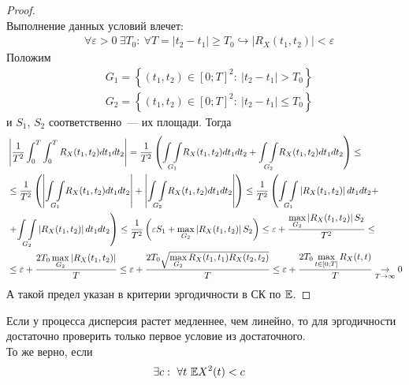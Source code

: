 \begin{proof}
    ~
    \\
    Выполнение данных условий влечет:
    \begin{align*}
      & \forall \varepsilon > 0 \ \exists T_0: \ \forall T = \left| t_2-t_1 \right|\geq T_0 \hookrightarrow \left| R_X(t_1,t_2) \right| < \varepsilon
    \end{align*}
    Положим
    \begin{align*}
      & G_1 = \left\{ (t_1,t_2) \in [0;T]^2: \ \left| t_2-t_1 \right| > T_0 \right\}
    \end{align*}
    \begin{align*}
      & G_2 = \left\{ (t_1,t_2) \in [0;T]^2: \ \left| t_2-t_1 \right| \leq T_0 \right\}
    \end{align*}
    и $S_1$, $S_2$ соответственно~--- их площади. Тогда
    \begin{align*}
      & \left| \frac{1}{T^2} \int_0^T\int_0^TR_X(t_1,t_2)dt_1dt_2 \right| = \frac{1}{T^2} \left( \underset{G_1}{\int\int}R_X(t_1,t_2)dt_1dt_2 + \underset{G_2}{\int\int}R_X(t_1,t_2)dt_1dt_2 \right) \leq \\
      & \leq \frac{1}{T^2} \left( \left| \underset{G_1}{\int\int}R_X(t_1,t_2)dt_1dt_2 \right| + \left| \underset{G_2}{\int\int}R_X(t_1,t_2)dt_1dt_2 \right| \right) \leq \frac{1}{T^2} \left( \underset{G_1}{\int\int}\left| R_X(t_1,t_2) \right| dt_1dt_2 + \right. \\
      & \left. + \underset{G_2}{\int\int}\left| R_X(t_1,t_2) \right| dt_1dt_2 \right) \leq \frac{1}{T^2} \left( \varepsilon S_1 + \max_{G_2}\left| R_X(t_1,t_2) \right| S_2 \right) \leq \varepsilon + \frac{\displaystyle \max_{G_2}\left| R_X(t_1,t_2) \right| S_2}{T^2} \leq \\
      & \leq \varepsilon + \frac{2T_0 \displaystyle \max_{G_2}\left| R_X(t_1,t_2) \right|}{T} \leq \varepsilon + \frac{2T_0 \sqrt{\displaystyle \max_{G_2} R_X(t_1,t_1)R_X(t_2,t_2)}}{T} \leq \varepsilon + \frac{2T_0 \displaystyle \max_{t \in [0;T]} R_X(t,t)}{T} \underset{T \to \infty}\rightarrow 0
    \end{align*}
    А такой предел указан в критерии эргодичности в СК по $\mathbb{E}$.
\end{proof}
\begin{Note}
    Если у процесса дисперсия растет медленнее, чем линейно, то для эргодичности
    достаточно проверить только первое условие из достаточного.
    \\
    То же верно, если
    \begin{align*}
      & \exists c: \ \forall t \ \mathbb{E} X^2(t) < c
    \end{align*}
\end{Note}
